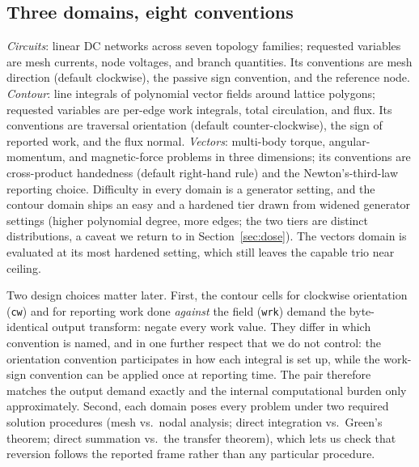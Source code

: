 \documentclass{article}
\begin{document}
\subsection{Three domains, eight conventions}\label{sec:domains}
\emph{Circuits}: linear DC networks across seven topology families; requested
variables are mesh currents, node voltages, and branch quantities. Its conventions
are mesh direction (default clockwise), the passive sign convention, and the
reference node. \emph{Contour}: line integrals of polynomial vector fields around
lattice polygons; requested variables are per-edge work integrals, total
circulation, and flux. Its conventions are traversal orientation (default
counter-clockwise), the sign of reported work, and the flux normal.
\emph{Vectors}: multi-body torque, angular-momentum, and magnetic-force problems
in three dimensions; its conventions are cross-product handedness (default
right-hand rule) and the Newton's-third-law reporting choice. Difficulty in every
domain is a generator setting, and the contour domain ships an easy and a hardened
tier drawn from widened generator settings (higher polynomial degree, more edges;
the two tiers are distinct distributions, a caveat we return to in
Section~\ref{sec:dose}). The vectors domain is evaluated at its most hardened
setting, which still leaves the capable trio near ceiling.

Two design choices matter later. First, the contour cells for clockwise
orientation (\texttt{cw}) and for reporting work done \emph{against} the field
(\texttt{wrk}) demand the byte-identical output transform: negate every work
value. They differ in which convention is named, and in one further respect that we
do not control: the orientation convention participates in how each integral is
set up, while the work-sign convention can be applied once at reporting time. The
pair therefore matches the output demand exactly and the internal computational
burden only approximately. Second, each domain poses every problem under two
required solution procedures (mesh vs.\ nodal analysis; direct integration vs.\
Green's theorem; direct summation vs.\ the transfer theorem), which lets us check
that reversion follows the reported frame rather than any particular procedure.
\end{document}
